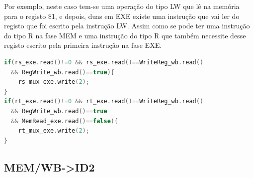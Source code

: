 \documentclass[pdftex,12pt,a4paper]{report}
\begin{document}
Por exemplo, neste caso tem-se uma operação do tipo LW que lê na memória para o registo \$1, e depois, duas em EXE existe uma instrução que vai ler do registo que foi escrito pela instrução LW. Assim como se pode ter uma instrução do tipo R na fase MEM e uma instrução do tipo R que também necessite desse registo escrito pela primeira instrução na fase EXE. 

\begin{lstlisting}[language=c]
if(rs_exe.read()!=0 && rs_exe.read()==WriteReg_wb.read()
  && RegWrite_wb.read()==true){
    rs_mux_exe.write(2);
}
if(rt_exe.read()!=0 && rt_exe.read()==WriteReg_wb.read() 
  && RegWrite_wb.read()==true 
  && MemRead_exe.read()==false){
    rt_mux_exe.write(2);
}
\end{lstlisting} 

\subsection{MEM/WB->ID2}

\begin{table}[!htb]
\centering
\label{my-label}
\end{table}
\end{document}
